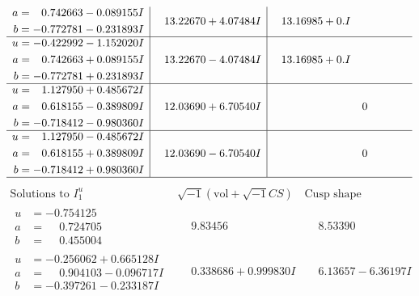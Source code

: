 \documentclass[1p]{elsarticle_modified}
\theoremstyle{definition}
\newcommand{\I}{\sqrt{-1}}
\begin{document}
$$\begin{array}{c|c|c}
\begin{aligned}
a &= \phantom{-}0.742663 - 0.089155 I \\
b &= -0.772781 - 0.231893 I\end{aligned}
 & \phantom{-}13.22670 + 4.07484 I & \phantom{-}13.16985 + 0. I\phantom{ +0.000000I} \\ \hline\begin{aligned}
u &= -0.422992 - 1.152020 I \\
a &= \phantom{-}0.742663 + 0.089155 I \\
b &= -0.772781 + 0.231893 I\end{aligned}
 & \phantom{-}13.22670 - 4.07484 I & \phantom{-}13.16985 + 0. I\phantom{ +0.000000I} \\ \hline\begin{aligned}
u &= \phantom{-}1.127950 + 0.485672 I \\
a &= \phantom{-}0.618155 - 0.389809 I \\
b &= -0.718412 - 0.980360 I\end{aligned}
 & \phantom{-}12.03690 + 6.70540 I & \phantom{-0.000000 } 0 \\ \hline\begin{aligned}
u &= \phantom{-}1.127950 - 0.485672 I \\
a &= \phantom{-}0.618155 + 0.389809 I \\
b &= -0.718412 + 0.980360 I\end{aligned}
 & \phantom{-}12.03690 - 6.70540 I & \phantom{-0.000000 } 0\\
 \hline 
 \end{array}$$\newpage$$\begin{array}{c|c|c}  
\text{Solutions to }I^u_{1}& \I (\text{vol} + \sqrt{-1}CS) & \text{Cusp shape}\\
 \hline 
\begin{aligned}
u &= -0.754125\phantom{ +0.000000I} \\
a &= \phantom{-}0.724705\phantom{ +0.000000I} \\
b &= \phantom{-}0.455004\phantom{ +0.000000I}\end{aligned}
 & \phantom{-}9.83456\phantom{ +0.000000I} & \phantom{-}8.53390\phantom{ +0.000000I} \\ \hline\begin{aligned}
u &= -0.256062 + 0.665128 I \\
a &= \phantom{-}0.904103 - 0.096717 I \\
b &= -0.397261 - 0.233187 I\end{aligned}
 & \phantom{-}0.338686 + 0.999830 I & \phantom{-}6.13657 - 6.36197 I \\ \hline\begin{aligned}

\end{aligned}
\end{array}$$
\end{document}
